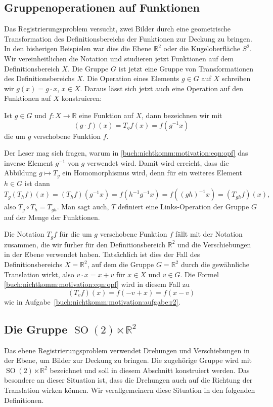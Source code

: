 \subsection{Gruppenoperationen auf Funktionen
\label{buch:nichtkomm:motivation:subsection:gruppenoperationen}}
Das Registrierungsproblem versucht, zwei Bilder durch eine geometrische
Transformation des Definitionsbereichs der Funktionen zur Deckung
zu bringen.
In den bisherigen Beispielen war dies die Ebene $\mathbb{R}^2$ oder
die Kugeloberfläche $S^2$.
Wir vereinheitlichen die Notation und studieren jetzt Funktionen
auf dem Definitionsbereich $X$.
Die Gruppe $G$ ist jetzt eine Gruppe von Transformationen des
Definitionsbereichs $X$.
Die Operation eines Elements $g\in G$ auf $X$ schreiben wir
$g(x) = g\cdot x$, $x\in X$.
Daraus lässt sich jetzt auch eine Operation auf den Funktionen auf
$X$ konstruieren:

\begin{definition}
Ist $g\in G$ und $f\colon X\to\mathbb{R}$ eine Funktion auf $X$, dann
bezeichnen wir mit
\begin{equation}
(g\cdot f)(x)
=
T_gf(x)
=
f(g^{-1}x)
\label{buch:nichtkomm:motivation:eqn:opf}
\end{equation}
die um $g$ verschobene Funktion $f$.
\end{definition}

Der Leser mag sich fragen, warum in
\eqref{buch:nichtkomm:motivation:eqn:opf}
das inverse Element $g^{-1}$ von $g$ verwendet wird.
Damit wird erreicht, dass die Abbildung $g\mapsto T_g$
ein Homomorphismus wird, denn für ein weiteres Element $h\in G$
ist dann
\[
T_g(T_hf)(x)
=
(T_hf)(g^{-1}x)
=
f(h^{-1}g^{-1}x)
=
f((gh)^{-1}x)
=
(T_{gh}f)(x),
\]
also $T_g\circ T_h= T_{gh}$.
Man sagt auch, $T$ definiert eine Links-Operation der Gruppe $G$ 
auf der Menge der Funktionen.

Die Notation $T_gf$ für die um $g$ verschobene Funktion $f$ fällt
mit der Notation zusammen, die wir fürher für den Definitionsbereich
$\mathbb{R}^2$ und die Verschiebungen in der Ebene verwendet haben.
Tatsächlich ist dies der Fall des Definitionsbereichs $X=\mathbb{R}^2$,
auf dem die Gruppe $G=\mathbb{R}^2$ durch die gewähnliche
Translation wirkt, also $v\cdot x = x +v$ für $x\in X$ und $v\in G$.
Die Formel \eqref{buch:nichtkomm:motivation:eqn:opf} wird in diesem
Fall zu
\[
(T_vf)(x) = f(-v + x) = f(x-v)
\]
wie in Aufgabe~\ref{buch:nichtkomm:motivation:aufgabe:r2}.

%
%
\subsection{Die Gruppe $\operatorname{SO}(2)\ltimes \mathbb{R}^2$
\label{buch:nichtkomm:motivation:subsection:so2lr^2}}
Das ebene Registrierungsproblem verwendet Drehungen und Verschiebungen
in der Ebene, um Bilder zur Deckung zu bringen.
Die zugehörige Gruppe wird mit $\operatorname{SO}(2)\ltimes\mathbb{R}^2$
bezeichnet und soll in diesem Abschnitt konstruiert werden.
Das besondere an dieser Situation ist, dass die Drehungen auch auf
die Richtung der Translation wirken können.
Wir verallgemeinern diese Situation in den folgenden Definitionen.

